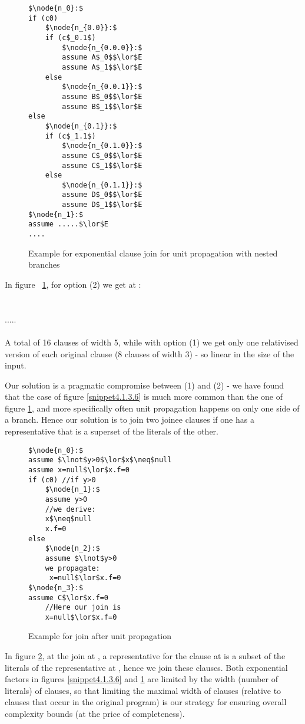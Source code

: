 \begin{figure}
\begin{lstlisting}
$\node{n_0}:$
if (c0)
	$\node{n_{0.0}}:$	
	if (c$_0.1$)
		$\node{n_{0.0.0}}:$	
		assume A$_0$$\lor$E
		assume A$_1$$\lor$E
	else	
		$\node{n_{0.0.1}}:$	
		assume B$_0$$\lor$E
		assume B$_1$$\lor$E
else
	$\node{n_{0.1}}:$	
	if (c$_1.1$)
		$\node{n_{0.1.0}}:$	
		assume C$_0$$\lor$E
		assume C$_1$$\lor$E
	else	
		$\node{n_{0.1.1}}:$	
		assume D$_0$$\lor$E
		assume D$_1$$\lor$E
$\node{n_1}:$
assume .....$\lor$E
....
\end{lstlisting}
\caption{Example for exponential clause join for unit propagation with nested branches\\
 }
\label{snippet4.1.3.7}
\end{figure}

\noindent
In figure ~\ref{snippet4.1.3.7}, for option (2) we get at :\\
\\
\\
.....\\
\\
A total of 16 clauses of width 5, while with option (1) we get only one relativised version of each original clause (8 clauses of width 3) - so linear in the size of the input.

Our solution is a pragmatic compromise between (1) and (2) - we have found that the case of figure \ref{snippet4.1.3.6} is much more common than the one of figure \ref{snippet4.1.3.7}, and more specifically often unit propagation happens on only one side of a branch. Hence our solution is to join two joinee clauses if one has a representative that is a superset of the literals of the other.

\begin{figure}
\begin{lstlisting}
$\node{n_0}:$
assume $\lnot$y>0$\lor$x$\neq$null
assume x=null$\lor$x.f=0
if (c0) //if y>0
	$\node{n_1}:$	
	assume y>0
	//we derive:
	x$\neq$null
	x.f=0
else
	$\node{n_2}:$	
	assume $\lnot$y>0
	we propagate:
	 x=null$\lor$x.f=0
$\node{n_3}:$
assume C$\lor$x.f=0
	//Here our join is
	x=null$\lor$x.f=0
\end{lstlisting}
\caption{Example for join after unit propagation\\
 }
\label{snippet4.1.3.8}
\end{figure}


In figure \ref{snippet4.1.3.8}, at the join at , a representative for the clause  at  is a subset of the literals 
of the representative  at , hence we join these clauses.
Both exponential factors in figures \ref{snippet4.1.3.6} and \ref{snippet4.1.3.7} are limited by the width (number of literals) 
of clauses, so that limiting the maximal width of clauses (relative to clauses that occur in the original program) is our strategy for ensuring overall complexity bounds (at the price of completeness).

